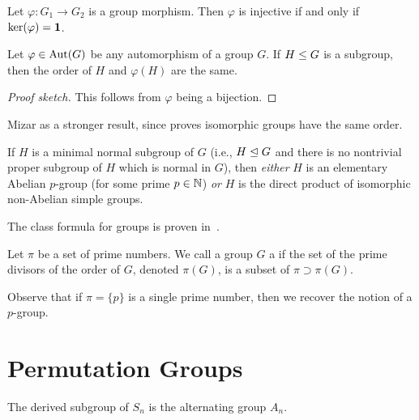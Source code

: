 \begin{theorem}
  Let $\varphi\colon G_{1}\to G_{2}$ is a group morphism.
  Then $\varphi$ is injective if and only if $\ker(\varphi)=\mathbf{1}$.
\end{theorem}


\begin{theorem}\label{thm:pure-math:iso-subgroups-have-same-order}
  Let $\varphi\in\operatorname{Aut}(G)$ be any automorphism of a group $G$.
  If $H\leq G$ is a subgroup, then the order of $H$ and
  $\varphi(H)$ are the same.
\end{theorem}

\begin{proof}[Proof sketch]
This follows from $\varphi$ being a bijection.
\end{proof}

\begin{thm-remark}
Mizar as a stronger result, since
\cite[Th73]{group6} proves isomorphic groups have the same order.
\end{thm-remark}

\begin{theorem}
  If $H$ is a minimal normal subgroup of $G$ (i.e., $H\trianglelefteq G$
  and there is no nontrivial proper subgroup of $H$ which is normal in
  $G$),
  then \emph{either} $H$ is an elementary Abelian $p$-group (for some
  prime $p\in\mathbb{N}$) \emph{or} $H$ is the direct product of isomorphic
  non-Abelian simple groups.
\end{theorem}

\begin{proposition}
The class formula for groups is proven in~.
\end{proposition}

\begin{definition}
Let $\pi$ be a set of prime numbers. We call a group $G$ a
 if the set of the prime divisors of the order of
$G$, denoted $\pi(G)$, is a subset of $\pi\supset\pi(G)$.
\end{definition}

Observe that if $\pi=\{p\}$ is a single prime number, then we recover
the notion of a $p$-group.


\section{Permutation Groups}

\begin{theorem}[Orre]
The derived subgroup of $S_{n}$ is the alternating group $A_{n}$.
\end{theorem}






